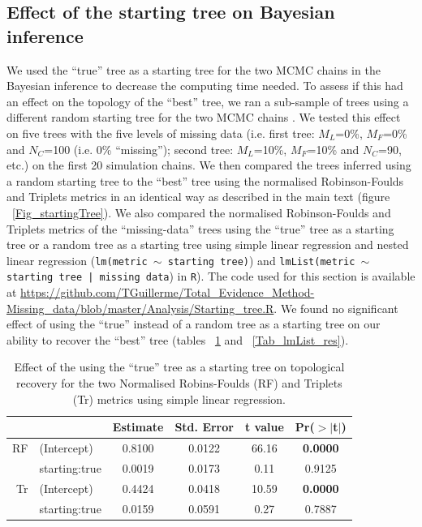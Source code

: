 \documentclass[12pt,letterpaper]{article}
\begin{document}
\subsection{Effect of the starting tree on Bayesian inference}
We used the ``true'' tree as a starting tree for the two MCMC chains in the Bayesian inference to decrease the computing time needed.
To assess if this had an effect on the topology of the ``best'' tree, we ran a sub-sample of trees using a different random starting tree for the two MCMC chains \citep[default MrBayes option;][]{Ronquist2012mrbayes}.
We tested this effect on five trees with the five levels of missing data (i.e. first tree: $M_L$=0\%, $M_F$=0\% and $N_C$=100 (i.e. 0\% ``missing''); second tree: $M_L$=10\%, $M_F$=10\% and $N_C$=90, etc.) on the first 20 simulation chains.
We then compared the trees inferred using a random starting tree to the ``best'' tree using the normalised Robinson-Foulds and Triplets metrics in an identical way as described in the main text (figure ~\ref{Fig_startingTree}).
We also compared the normalised Robinson-Foulds and Triplets metrics of the ``missing-data'' trees using the ``true'' tree as a starting tree or a random tree as a starting tree using simple linear regression and nested linear regression (\texttt{lm(metric $\sim$ starting tree)}) and \texttt{lmList(metric $\sim$ starting tree | missing data}) in \texttt{R}).
The code used for this section is available at \url{https://github.com/TGuillerme/Total_Evidence_Method-Missing_data/blob/master/Analysis/Starting_tree.R}.
We found no significant effect of using the ``true'' instead of a random tree as a starting tree on our ability to recover the ``best'' tree (tables ~\ref{Tab_lm_res} and ~\ref{Tab_lmList_res}).

\begin{table}[ht]
\caption{Effect of the using the ``true'' tree as a starting tree on topological recovery for the two Normalised Robins-Foulds (RF) and Triplets (Tr) metrics using simple linear regression.} %
\label{Tab_lm_res}
\centering
\begin{tabular}{rlcccc}
  \hline
 & & Estimate & Std. Error & t value & Pr($>$$|$t$|$) \\ 
  \hline
RF & (Intercept) & 0.8100 & 0.0122 & 66.16 & \textbf{0.0000} \\ 
   & starting:true & 0.0019 & 0.0173 & 0.11 & 0.9125 \\
Tr & (Intercept) & 0.4424 & 0.0418 & 10.59 & \textbf{0.0000} \\ 
   & starting:true & 0.0159 & 0.0591 & 0.27 & 0.7887 \\ 
   \hline
\end{tabular}
\end{table}
\end{document}
